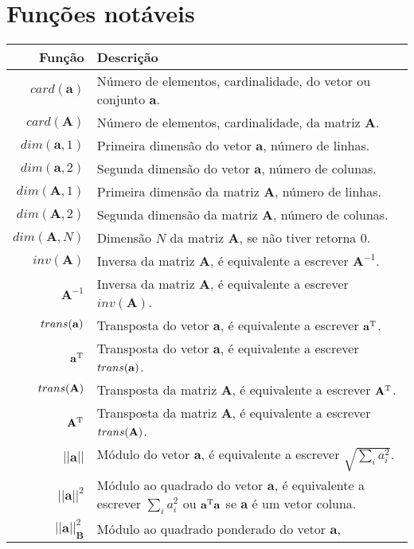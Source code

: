 \section*{Funções notáveis}
\begin{tabular}{r | p{.70\linewidth} }
\hline	
Função & Descrição \\ \hline
$card(\mathbf{a})$ & Número de elementos, cardinalidade, do vetor ou conjunto $\mathbf{a}$. \\
$card(\mathbf{A})$ & Número de elementos, cardinalidade, da matriz $\mathbf{A}$. \\
\hline
$dim(\mathbf{a},1)$ & Primeira dimensão do vetor $\mathbf{a}$, número de linhas. \\
$dim(\mathbf{a},2)$ & Segunda dimensão do vetor $\mathbf{a}$, número de colunas. \\
$dim(\mathbf{A},1)$ & Primeira dimensão da matriz $\mathbf{A}$, número de linhas. \\
$dim(\mathbf{A},2)$ & Segunda dimensão da matriz $\mathbf{A}$, número de colunas. \\
$dim(\mathbf{A},N)$ & Dimensão $N$ da matriz $\mathbf{A}$, se não tiver retorna $0$. \\
\hline
$inv(\mathbf{A})$ & Inversa da matriz $\mathbf{A}$, é equivalente a escrever $\mathbf{A}^{-1}$. \\
$\mathbf{A}^{-1}$ & Inversa da matriz $\mathbf{A}$, é equivalente a escrever $inv(\mathbf{A})$. \\
\hline
$trans(\mathbf{a})$ & Transposta do vetor $\mathbf{a}$, é equivalente a escrever $\mathbf{a}^{\mathrm{T}}$. \\
$\mathbf{a}^{\mathrm{T}}$ & Transposta do vetor $\mathbf{a}$, é equivalente a escrever $trans(\mathbf{a})$. \\
$trans(\mathbf{A})$ & Transposta da matriz $\mathbf{A}$, é equivalente a escrever $\mathbf{A}^{\mathrm{T}}$. \\
$\mathbf{A}^{\mathrm{T}}$ & Transposta da matriz $\mathbf{A}$, é equivalente a escrever $trans(\mathbf{A})$. \\
\hline
$||\mathbf{a}||$ & Módulo do vetor $\mathbf{a}$, é equivalente a escrever $\sqrt{\sum_i a_i^2}$. \\
$||\mathbf{a}||^2$ & Módulo ao quadrado do vetor $\mathbf{a}$, 
é equivalente a escrever $\sum_i a_i^2$ ou $\mathbf{a}^{\mathrm{T}}\mathbf{a}$ se $\mathbf{a}$ é um vetor coluna. \\
$||\mathbf{a}||_{\mathbf{B}}^2$ & Módulo ao quadrado ponderado do vetor $\mathbf{a}$, 

\end{tabular}
